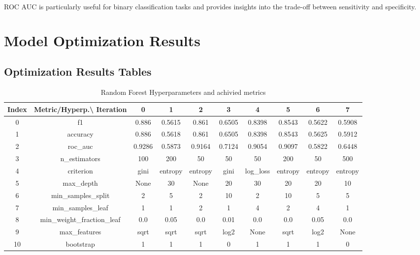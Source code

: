 \documentclass{article}%
\begin{document}
                ROC AUC is particularly useful for binary classification tasks and provides insights into the trade-off between sensitivity and specificity.
                

%
\newpage%
\section{Model Optimization Results}%
\label{sec:ModelOptimizationResults}%
\subsection{Optimization Results Tables}%
\label{subsec:OptimizationResultsTables}%


\begin{table}[h!]%
\caption{Random Forest Hyperparameters and achivied metrics}%
\vspace{0.2cm}%
\centering%
\begin{tabular}{|c||c||c||c||c||c||c||c||c||c|}%
\hline%
Index&Metric/Hyperp.\textbackslash{} Iteration&0&1&2&3&4&5&6&7\\%
\hline%
0&f1&0.886&0.5615&0.861&0.6505&0.8398&0.8543&0.5622&0.5908\\%
1&accuracy&0.886&0.5618&0.861&0.6505&0.8398&0.8543&0.5625&0.5912\\%
2&roc\_auc&0.9286&0.5873&0.9164&0.7124&0.9054&0.9097&0.5822&0.6448\\%
3&n\_estimators&100&200&50&50&50&200&50&500\\%
4&criterion&gini&entropy&entropy&gini&log\_loss&entropy&entropy&entropy\\%
5&max\_depth&None&30&None&20&30&20&20&10\\%
6&min\_samples\_split&2&5&2&10&2&10&5&5\\%
7&min\_samples\_leaf&1&1&2&1&4&2&4&1\\%
8&min\_weight\_fraction\_leaf&0.0&0.05&0.0&0.01&0.0&0.0&0.05&0.0\\%
9&max\_features&sqrt&sqrt&sqrt&log2&None&sqrt&log2&None\\%
10&bootstrap&1&1&1&0&1&1&1&0\\%
\hline%
\end{tabular}%
\end{table}

%
\end{document}
